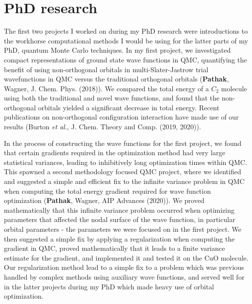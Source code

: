 \documentclass{article}
\begin{document}
\section{PhD research}
The first two projects I worked on during my PhD research were introductions to the workhorse computational methods I would be using for the latter parts of my PhD, quantum Monte Carlo techniques.
In my first project, we investigated compact representations of ground state wave functions in QMC,  quantifying the benefit of using non-orthogonal orbitals in multi-Slater-Jastrow trial wavefunctions in QMC versus the traditional orthogonal orbitals (\textbf{Pathak}, Wagner,  J. Chem. Phys.  (2018)).
We compared the total energy of a $C_2$ molecule using both the traditional and novel wave functions, and found that the non-orthogonal orbitals yielded a significant decrease in total energy.
Recent publications on non-orthogonal configuration interaction have made use of our results (Burton \textit{et al.}, J. Chem. Theory and Comp. (2019, 2020)).

In the process of constructing the wave functions for the first project, we found that certain gradients required in the optimization method had very large statistical variances,  leading to inhibitively long optimization times within QMC.
This spawned a second methodology focused QMC project, where we identified and suggested a simple and efficient fix to the infinite variance problem in QMC when computing the total energy gradient required for wave function optimization (\textbf{Pathak}, Wagner, AIP Advances (2020)).
We proved mathematically that this infinite variance problem occurred when optimizing parameters that affected the nodal surface of the wave function, in particular orbital parameters - the parameters we were focused on in the first project.
We then suggested a simple fix by applying a regularization when computing the gradient in QMC,  proved mathematically that it leads to a finite variance estimate for the gradient, and implemented it and tested it on the CuO molecule.
Our regularization method lead to a simple fix to a problem which was previous handled by complex methods using auxiliary wave functions, and served well for in the latter projects during my PhD which made heavy use of orbital optimization.
\end{document}
